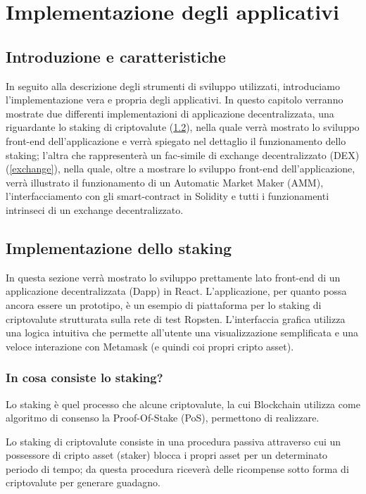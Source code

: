 
\chapter{Implementazione degli applicativi}\makeatletter{}\makeatother
\label{cap3}

\section{Introduzione e caratteristiche}\label{Organizzazione_applicativo}
In seguito alla descrizione degli strumenti di sviluppo utilizzati, introduciamo l'implementazione vera e propria degli applicativi.
In questo capitolo verranno mostrate due differenti implementazioni di applicazione decentralizzata, una riguardante lo staking di criptovalute (\ref{staking_app}), nella quale verrà mostrato lo sviluppo front-end dell'applicazione e verrà spiegato nel dettaglio il funzionamento dello staking; l'altra che rappresenterà un fac-simile di exchange decentralizzato (DEX)(\ref{exchange}), nella quale, oltre a mostrare lo sviluppo front-end dell'applicazione, verrà illustrato il funzionamento di un Automatic Market Maker (AMM), l'interfacciamento con gli smart-contract in Solidity e tutti i funzionamenti intrinseci di un exchange decentralizzato.

\section{Implementazione dello staking}\label{staking_app}
In questa sezione verrà mostrato lo sviluppo prettamente lato front-end di un applicazione decentralizzata (Dapp) in React.
L’applicazione, per quanto possa ancora essere un prototipo, è un esempio di piattaforma per lo staking di criptovalute strutturata sulla rete di test Ropsten. L'interfaccia grafica utilizza una logica intuitiva che permette all'utente una visualizzazione semplificata e una veloce interazione con Metamask (e quindi coi propri cripto asset).
\subsection{In cosa consiste lo staking?}\label{staking_def}
Lo staking è quel processo che alcune criptovalute, la cui Blockchain utilizza come algoritmo di consenso la Proof-Of-Stake (PoS), permettono di realizzare.

Lo staking di criptovalute consiste in una procedura passiva attraverso cui un possessore di cripto asset (staker) blocca i propri asset per un determinato periodo di tempo; da questa procedura riceverà delle ricompense sotto forma di criptovalute per generare guadagno. 

